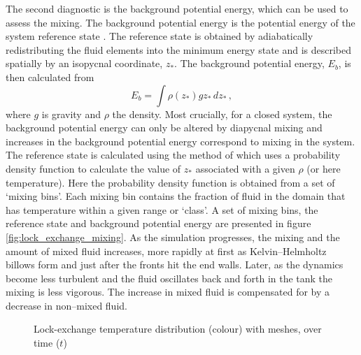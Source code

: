 The second diagnostic is the background potential energy, which can be used to assess the mixing. The background potential energy is the potential energy of the system reference state \citep{winters1995, winters1996}. The reference state is obtained by adiabatically redistributing the fluid elements into the minimum energy state and is described spatially by an isopycnal coordinate, $z_*$. The background potential energy, $E_b$, is then calculated from
\begin{equation}
E_b = \int \rho(z_*) g z_* \, dz_* \, ,
\end{equation}
where $g$ is gravity and $\rho$ the density. Most crucially, for a closed system, the background potential energy can only be altered by diapycnal mixing and increases in the background potential energy correspond to mixing in the system. The reference state is calculated using the method of \citet{tseng2001} which uses a probability density function to calculate the value of $z_*$ associated with a given $\rho$ (or here temperature). Here the probability density function is obtained from a set of `mixing bins'. Each mixing bin contains the fraction of fluid in the domain that has temperature within a given range or `class'. A set of mixing bins, the reference state and background potential energy are presented in figure \ref{fig:lock_exchange_mixing}. As the simulation progresses, the mixing and the amount of mixed fluid increases, more rapidly at first as Kelvin--Helmholtz billows form and just after the fronts hit the end walls. Later, as the dynamics become less turbulent and the fluid oscillates back 
and forth in the tank the mixing is less vigorous. The increase in mixed fluid is compensated for by a decrease in non--mixed fluid.


\begin{figure}[ht]
  \centering
  \caption{Lock-exchange temperature distribution (colour) with meshes, over time ($t$)}
  \label{fig:lock_exchange}
\end{figure}

